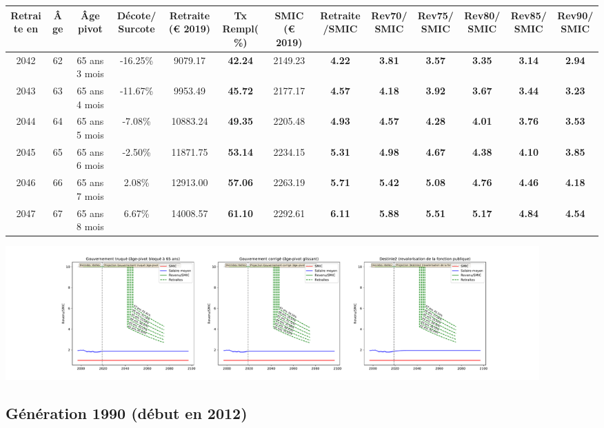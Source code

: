 { \scriptsize \begin{center} 
\begin{tabular}[htb]{|c|c||c|c||c|c||c||c|c|c|c|c|c|} 
\hline 
 Retraite en &  Âge &  Âge pivot &  Décote/Surcote &  Retraite (\euro{} 2019) &  Tx Rempl(\%) &  SMIC (\euro{} 2019) &  Retraite/SMIC &  Rev70/SMIC &  Rev75/SMIC &  Rev80/SMIC &  Rev85/SMIC &  Rev90/SMIC \\ 
\hline \hline 
 2042 &  62 &  65 ans 3 mois &  -16.25\% &  9079.17 &  {\bf 42.24} &  2149.23 &  {\bf 4.22} &  {\bf 3.81} &  {\bf 3.57} &  {\bf 3.35} &  {\bf 3.14} &  {\bf 2.94} \\ 
\hline 
 2043 &  63 &  65 ans 4 mois &  -11.67\% &  9953.49 &  {\bf 45.72} &  2177.17 &  {\bf 4.57} &  {\bf 4.18} &  {\bf 3.92} &  {\bf 3.67} &  {\bf 3.44} &  {\bf 3.23} \\ 
\hline 
 2044 &  64 &  65 ans 5 mois &  -7.08\% &  10883.24 &  {\bf 49.35} &  2205.48 &  {\bf 4.93} &  {\bf 4.57} &  {\bf 4.28} &  {\bf 4.01} &  {\bf 3.76} &  {\bf 3.53} \\ 
\hline 
 2045 &  65 &  65 ans 6 mois &  -2.50\% &  11871.75 &  {\bf 53.14} &  2234.15 &  {\bf 5.31} &  {\bf 4.98} &  {\bf 4.67} &  {\bf 4.38} &  {\bf 4.10} &  {\bf 3.85} \\ 
\hline 
 2046 &  66 &  65 ans 7 mois &  2.08\% &  12913.00 &  {\bf 57.06} &  2263.19 &  {\bf 5.71} &  {\bf 5.42} &  {\bf 5.08} &  {\bf 4.76} &  {\bf 4.46} &  {\bf 4.18} \\ 
\hline 
 2047 &  67 &  65 ans 8 mois &  6.67\% &  14008.57 &  {\bf 61.10} &  2292.61 &  {\bf 6.11} &  {\bf 5.88} &  {\bf 5.51} &  {\bf 5.17} &  {\bf 4.84} &  {\bf 4.54} \\ 
\hline 
\hline 
\end{tabular} 
\end{center} } 

 \begin{center}\includegraphics[width=0.9\textwidth]{fig/Riche_1980_22_dest_retraite.pdf}\end{center} \label{fig/Riche_1980_22_dest_retraite.pdf} 

\newpage 
 
\subsection{Génération 1990 (début en 2012)} 

